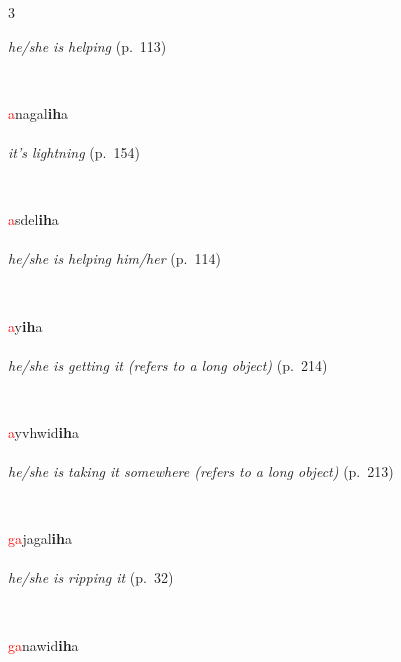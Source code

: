 \documentclass[oneside,openany]{book}%
\begin{document}
\begin{multicols}{3}
\begin{minipage}[t]{\linewidth}
\noindent \textit{he/she is helping} (p.~113)
\end{minipage}\\[1em]%
\begin{minipage}[t]{\linewidth}
\raggedright\noindent \textcolor{Red}{a}nagal\textbf{ih}a\\
\\
\noindent \textit{it's lightning} (p.~154)
\end{minipage}\\[1em]%
\begin{minipage}[t]{\linewidth}
\raggedright\noindent \textcolor{Red}{a}sdel\textbf{ih}a\\
\\
\noindent \textit{he/she is helping him/her} (p.~114)
\end{minipage}\\[1em]%
\begin{minipage}[t]{\linewidth}
\raggedright\noindent \textcolor{Red}{a}y\textbf{ih}a\\
\\
\noindent \textit{he/she is getting it (refers to a long object)} (p.~214)
\end{minipage}\\[1em]%
\begin{minipage}[t]{\linewidth}
\raggedright\noindent \textcolor{Red}{a}yvhwid\textbf{ih}a\\
\\
\noindent \textit{he/she is taking it somewhere (refers to a long object)} (p.~213)
\end{minipage}\\[1em]%
\begin{minipage}[t]{\linewidth}
\raggedright\noindent \textcolor{Red}{ga}jagal\textbf{ih}a\\
\\
\noindent \textit{he/she is ripping it} (p.~32)
\end{minipage}\\[1em]%
\begin{minipage}[t]{\linewidth}
\raggedright\noindent \textcolor{Red}{ga}nawid\textbf{ih}a\\

\end{minipage}
\end{multicols}
\end{document}
